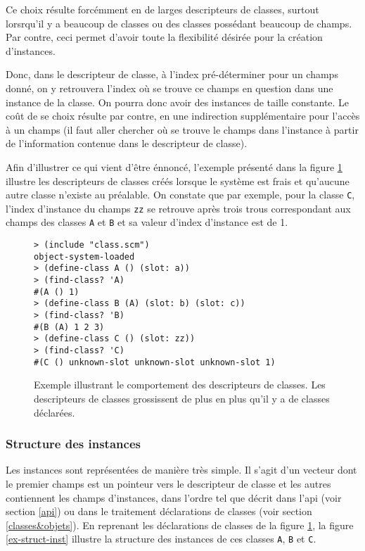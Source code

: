 \documentclass[letterpaper,12pt]{book}
\begin{document}
      Ce choix résulte forcémment en de larges descripteurs de classes,
      surtout lorsrqu'il y a beaucoup de classes ou des classes
      possédant beaucoup de champs. Par contre, ceci permet d'avoir
      toute la flexibilité désirée pour la création d'instances. 

      Donc, dans le descripteur de classe, à l'index pré-déterminer pour
      un champs donné, on y retrouvera l'index où se trouve ce champs en
      question dans une instance de la classe. On pourra donc avoir des
      instances de taille constante. Le coût de se choix résulte par
      contre, en une indirection supplémentaire pour l'accès à un champs
      (il faut aller chercher où se trouve le champs dans l'instance à
      partir de l'information contenue dans le descripteur de classe).

      Afin d'illustrer ce qui vient d'être énnoncé, l'exemple présenté
      dans la figure \ref{ex-cdesc} illustre les descripteurs de classes
      créés lorsque le système est \og frais \fg et qu'aucune autre
      classe n'existe au préalable. On constate que par exemple, pour la
      classe \texttt{C}, l'index d'instance du champs \texttt{zz} se
      retrouve après trois \og trous \fg correspondant aux champs des
      classes \texttt{A} et \texttt{B} et sa valeur d'index d'instance
      est de 1.

      \begin{figure}[h!]
        \begin{lstlisting}
> (include "class.scm")
object-system-loaded
> (define-class A () (slot: a))
> (find-class? 'A)
#(A () 1)
> (define-class B (A) (slot: b) (slot: c))
> (find-class? 'B)
#(B (A) 1 2 3)
> (define-class C () (slot: zz))
> (find-class? 'C)
#(C () unknown-slot unknown-slot unknown-slot 1)
        \end{lstlisting}
        \caption{Exemple illustrant le comportement des descripteurs de
          classes. Les descripteurs de classes grossissent de plus en
          plus qu'il y a de classes déclarées.}
        \label{ex-cdesc}
      \end{figure}

    \subsubsection{Structure des instances}
      \label{inst-struct}
      Les instances sont représentées de manière très simple. Il
      s'agit d'un vecteur dont le premier champs est un pointeur vers
      le descripteur de classe et les autres contiennent les champs
      d'instances, dans l'ordre tel que décrit dans l'api (voir
      section \ref{api}) ou dans le traitement déclarations de classes
      (voir section \ref{classes&objets}). En reprenant les
      déclarations de classes de la figure \ref{ex-cdesc}, la figure
      \ref{ex-struct-inst} illustre la structure des instances de ces
      classes \texttt{A}, \texttt{B} et \texttt{C}.
\end{document}
